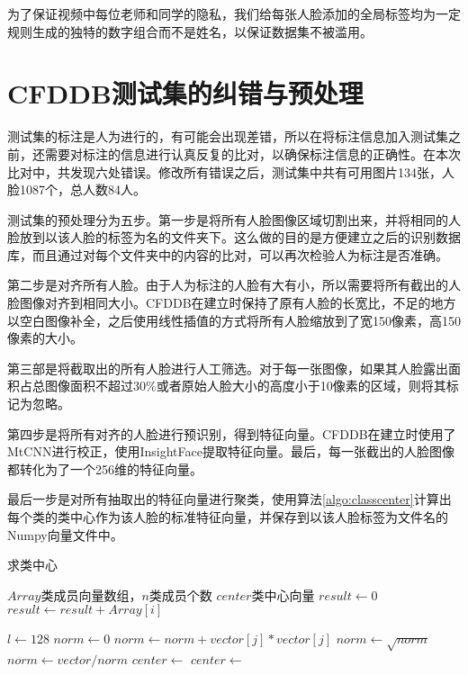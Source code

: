 为了保证视频中每位老师和同学的隐私，我们给每张人脸添加的全局标签均为一定规则生成的独特的数字组合而不是姓名，以保证数据集不被滥用。

\section{CFDDB测试集的纠错与预处理}

测试集的标注是人为进行的，有可能会出现差错，所以在将标注信息加入测试集之前，还需要对标注的信息进行认真反复的比对，以确保标注信息的正确性。在本次比对中，共发现六处错误。修改所有错误之后，测试集中共有可用图片134张，人脸1087个，总人数84人。

测试集的预处理分为五步。第一步是将所有人脸图像区域切割出来，并将相同的人脸放到以该人脸的标签为名的文件夹下。这么做的目的是方便建立之后的识别数据库，而且通过对每个文件夹中的内容的比对，可以再次检验人为标注是否准确。

第二步是对齐所有人脸。由于人为标注的人脸有大有小，所以需要将所有截出的人脸图像对齐到相同大小。CFDDB在建立时保持了原有人脸的长宽比，不足的地方以空白图像补全，之后使用线性插值的方式将所有人脸缩放到了宽150像素，高150像素的大小。

第三部是将截取出的所有人脸进行人工筛选。对于每一张图像，如果其人脸露出面积占总图像面积不超过$30\%$或者原始人脸大小的高度小于10像素的区域，则将其标记为忽略。

第四步是将所有对齐的人脸进行预识别，得到特征向量。CFDDB在建立时使用了MtCNN\cite{zhang2016joint}进行校正，使用InsightFace\cite{deng2018arcface}提取特征向量。最后，每一张截出的人脸图像都转化为了一个256维的特征向量。

最后一步是对所有抽取出的特征向量进行聚类，使用算法\ref{algo:classcenter}计算出每个类的类中心作为该人脸的标准特征向量，并保存到以该人脸标签为文件名的Numpy向量文件中。

\begin{algorithm}
	\caption{求类中心}
	\label{algo:classcenter}
	\begin{algorithmic}[1] %
		\Require $Array$类成员向量数组，$n$类成员个数 %
		\Ensure $center$类中心向量 %
		\State $result \gets 0$
		\State $result \gets result + Array[i]$
		\EndFor
		\State {}
		\EndFunction
	\end{algorithmic}
\end{algorithm}

\begin{algorithm}
	\begin{algorithmic}[1]
		\State $l\gets 128$
		\State $norm\gets 0$
		\State $norm\gets norm + vector[j] * vector[j]$
		\EndFor
		\State $norm\gets \sqrt{norm}$
		\State $norm\gets vector / norm$
		\State {}
		\EndFunction
		\State
		\State $center\gets $
		\State $center\gets $
		\State {}
		\EndFunction
	\end{algorithmic}
\end{algorithm}

